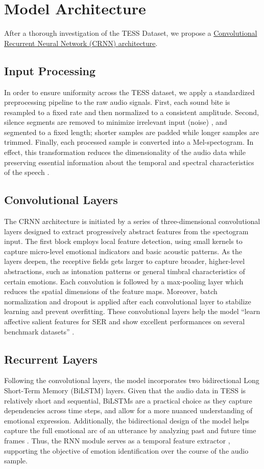 \documentclass[../main.tex]{subfiles}
\begin{document}
\section{Model Architecture}
After a thorough investigation of the TESS Dataset, we propose a \hyperref[fig:architecture]{Convolutional
Recurrent Neural Network (CRNN) architecture}.

\subsection{Input Processing}
In order to ensure uniformity across the TESS dataset, we apply a standardized
preprocessing pipeline to the raw audio signals. First, each sound bite is
resampled to a fixed rate and then normalized to a consistent amplitude. Second,
silence segments are removed to minimize irrelevant input (noise) \citep{Orhan2021}, and segmented
to a fixed length; shorter samples are padded while longer samples are trimmed.
Finally, each processed sample is converted into a Mel-spectogram. In effect,
this transformation reduces the dimensionality of the audio data while
preserving essential information about the temporal and spectral characteristics
of the speech \citep{Orhan2021}.

\subsection{Convolutional Layers}
The CRNN architecture is initiated by a series of three-dimensional convolutional
layers designed to extract progressively abstract features from the spectogram
input. The first block employs local feature detection, using small kernels to
capture micro-level emotional indicators and basic acoustic patterns. As the
layers deepen, the receptive fields gets larger to capture broader, higher-level
abstractions, such as intonation patterns or general timbral characteristics of
certain emotions. Each convolution is followed by a max-pooling layer which
reduces the spatial dimensions of the feature maps. Moreover, batch
normalization and dropout is applied after each convolutional layer to stabilize
learning and prevent overfitting. These convolutional layers help the model ``learn affective salient features for SER and show excellent performances on several benchmark datasets'' \citep{Chen2018}.

\subsection{Recurrent Layers}
Following the convolutional layers, the model incorporates two bidirectional
Long Short-Term Memory (BiLSTM) layers. Given that the audio data in TESS is
relatively short and sequential, BiLSTMs are a practical choice as they capture
dependencies across time steps, and allow for a more nuanced understanding of
emotional expression. Additionally, the bidirectional design of the model helps
capture the full emotional arc of an utterance by analyzing past and future time
frames \citep{Orhan2021}. Thus, the RNN module serves as a temporal feature extractor \citep{Chen2018}, supporting
the objective of emotion identification over the course of the audio sample.
\end{document}
